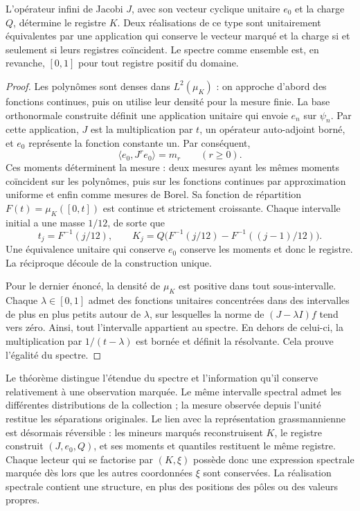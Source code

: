 \begin{theorem}
\label{thm:jacobi-marked-faithfulness}
L’opérateur infini de Jacobi \(J\), avec son vecteur cyclique
unitaire \(e_0\) et la charge \(Q\), détermine le registre \(K\).
Deux réalisations de ce type sont unitairement équivalentes par
une application qui conserve le vecteur marqué et la charge si et seulement
si leurs registres coïncident. Le spectre comme ensemble est, en revanche,
\([0,1]\) pour tout registre positif du domaine.
\end{theorem}
\begin{proof}
Les polynômes sont denses dans \(L^2(\mu_K)\) : on approche d’abord des
fonctions continues, puis on utilise leur densité pour la mesure finie.
La base orthonormale construite définit une application unitaire qui envoie
\(e_n\) sur \(\psi_n\). Par cette application, \(J\) est la multiplication par
\(t\), un opérateur auto-adjoint borné, et \(e_0\) représente la
fonction constante un. Par conséquent,
\[
 \langle e_0,J^re_0\rangle=m_r\qquad(r\geq0).
\]
Ces moments déterminent la mesure : deux mesures ayant les mêmes
moments coïncident sur les polynômes, puis sur les fonctions continues par
approximation uniforme et enfin comme mesures de Borel.
Sa fonction de répartition \(F(t)=\mu_K([0,t])\) est continue et strictement
croissante. Chaque intervalle initial a une masse \(1/12\), de sorte que
\[
 t_j=F^{-1}(j/12),\qquad
 K_j=Q\bigl(F^{-1}(j/12)-F^{-1}((j-1)/12)\bigr).
\]
Une équivalence unitaire qui conserve \(e_0\) conserve les moments et donc le registre. La réciproque découle de la construction unique.

Pour le dernier énoncé, la densité de \(\mu_K\) est positive dans tout sous-intervalle. Chaque \(\lambda\in[0,1]\) admet des fonctions unitaires concentrées dans des intervalles de plus en plus petits autour de \(\lambda\), sur lesquelles la norme de \((J-\lambda I)f\) tend vers zéro. Ainsi, tout l'intervalle appartient au spectre. En dehors de celui-ci, la multiplication par \(1/(t-\lambda)\) est bornée et définit la résolvante. Cela prouve l'égalité du spectre.
\end{proof}

Le théorème distingue l'étendue du spectre et l'information qu'il conserve relativement à une observation marquée. Le même intervalle spectral admet les différentes distributions de la collection ; la mesure observée depuis l'unité restitue les séparations originales. Le lien avec la représentation grassmannienne est désormais réversible : les mineurs marqués reconstruisent \(K\), le registre construit \((J,e_0,Q)\), et ses moments et quantiles restituent le même registre. Chaque lecteur qui se factorise par \((K,\xi)\) possède donc une expression spectrale marquée dès lors que les autres coordonnées \(\xi\) sont conservées. La réalisation spectrale contient une structure, en plus des positions des pôles ou des valeurs propres.
